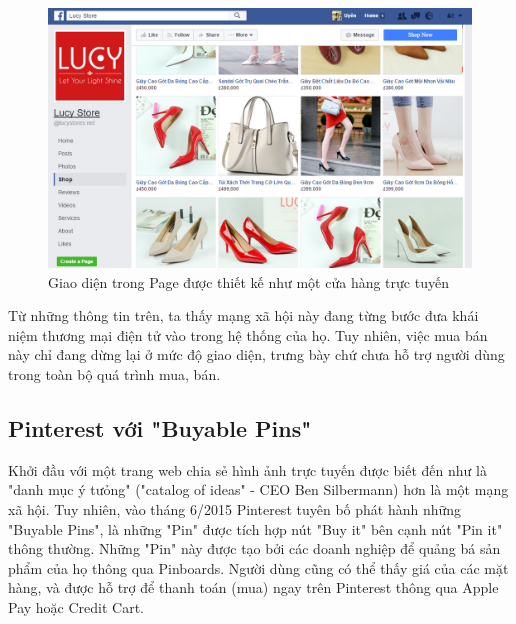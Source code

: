 \begin{figure}[H]
	\centering
	\includegraphics[scale=.5]{img/fb-in-store.PNG} 
	\caption{Giao diện trong Page được thiết kế như một cửa hàng trực tuyến}
\end{figure}

Từ những thông tin trên, ta thấy mạng xã hội này đang từng bước đưa khái niệm thương mại điện tử vào trong hệ thống của họ. Tuy nhiên, việc mua bán này chỉ đang dừng lại ở mức độ giao diện, trưng bày chứ chưa hỗ trợ người dùng trong toàn bộ quá trình mua, bán.

\subsection{Pinterest với "Buyable Pins"}
Khởi đầu với một trang web chia sẻ hình ảnh trực tuyến được biết đến như là "danh mục ý tưỏng" ("catalog of ideas" - CEO Ben Silbermann) hơn là một mạng xã hội. Tuy nhiên, vào tháng 6/2015 Pinterest tuyên bố phát hành những "Buyable Pins", là những "Pin" được tích hợp nút "Buy it" bên cạnh nút "Pin it" thông thường. Những "Pin" này được tạo bởi các doanh nghiệp để quảng bá sản phẩm của họ thông qua Pinboards. Người dùng cũng có thể thấy giá của các mặt hàng, và được hỗ trợ để thanh toán (mua) ngay trên Pinterest thông qua Apple Pay hoặc Credit Cart. 


